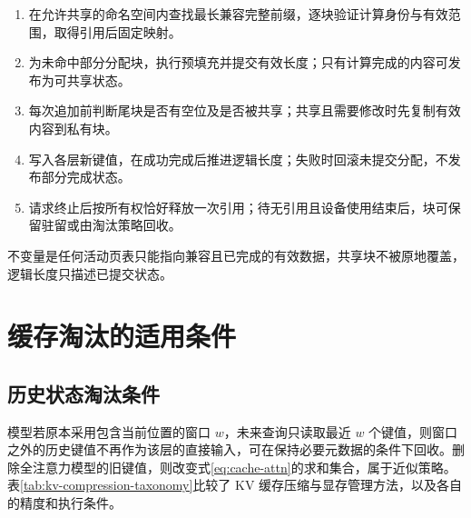 \documentclass[../textbook.tex]{subfiles}
\begin{document}
\begin{algorithm}[前缀缓存的引用与追加]
\begin{enumerate}
\item 在允许共享的命名空间内查找最长兼容完整前缀，逐块验证计算身份与有效范围，取得引用后固定映射。
\item 为未命中部分分配块，执行预填充并提交有效长度；只有计算完成的内容可发布为可共享状态。
\item 每次追加前判断尾块是否有空位及是否被共享；共享且需要修改时先复制有效内容到私有块。
\item 写入各层新键值，在成功完成后推进逻辑长度；失败时回滚未提交分配，不发布部分完成状态。
\item 请求终止后按所有权恰好释放一次引用；待无引用且设备使用结束后，块可保留驻留或由淘汰策略回收。
\end{enumerate}
不变量是任何活动页表只能指向兼容且已完成的有效数据，共享块不被原地覆盖，逻辑长度只描述已提交状态。
\end{algorithm}

\section{缓存淘汰的适用条件}

\subsection{历史状态淘汰条件}
模型若原本采用包含当前位置的窗口 $w$，未来查询只读取最近 $w$ 个键值，则窗口之外的历史键值不再作为该层的直接输入，可在保持必要元数据的条件下回收。删除全注意力模型的旧键值，则改变式\eqref{eq:cache-attn}的求和集合，属于近似策略。表\ref{tab:kv-compression-taxonomy}比较了 KV 缓存压缩与显存管理方法，以及各自的精度和执行条件。
\end{document}
